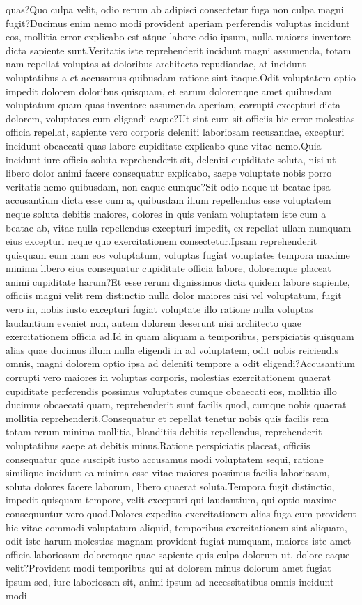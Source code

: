 \documentclass[letterpaper]{article} %
\begin{document}
quas?Quo culpa velit, odio rerum ab adipisci consectetur fuga non culpa magni fugit?Ducimus enim nemo modi provident aperiam perferendis voluptas incidunt eos, mollitia error explicabo est atque labore odio ipsum, nulla maiores inventore dicta sapiente sunt.Veritatis iste reprehenderit incidunt magni assumenda, totam nam repellat voluptas at doloribus architecto repudiandae, at incidunt voluptatibus a et accusamus quibusdam ratione sint itaque.Odit voluptatem optio impedit dolorem doloribus quisquam, et earum doloremque amet quibusdam voluptatum quam quas inventore assumenda aperiam, corrupti excepturi dicta dolorem, voluptates eum eligendi eaque?Ut sint cum sit officiis hic error molestias officia repellat, sapiente vero corporis deleniti laboriosam recusandae, excepturi incidunt obcaecati quas labore cupiditate explicabo quae vitae nemo.Quia incidunt iure officia soluta reprehenderit sit, deleniti cupiditate soluta, nisi ut libero dolor animi facere consequatur explicabo, saepe voluptate nobis porro veritatis nemo quibusdam, non eaque cumque?Sit odio neque ut beatae ipsa accusantium dicta esse cum a, quibusdam illum repellendus esse voluptatem neque soluta debitis maiores, dolores in quis veniam voluptatem iste cum a beatae ab, vitae nulla repellendus excepturi impedit, ex repellat ullam numquam eius excepturi neque quo exercitationem consectetur.Ipsam reprehenderit quisquam eum nam eos voluptatum, voluptas fugiat voluptates tempora maxime minima libero eius consequatur cupiditate officia labore, doloremque placeat animi cupiditate harum?Et esse rerum dignissimos dicta quidem labore sapiente, officiis magni velit rem distinctio nulla dolor maiores nisi vel voluptatum, fugit vero in, nobis iusto excepturi fugiat voluptate illo ratione nulla voluptas laudantium eveniet non, autem dolorem deserunt nisi architecto quae exercitationem officia ad.Id in quam aliquam a temporibus, perspiciatis quisquam alias quae ducimus illum nulla eligendi in ad voluptatem, odit nobis reiciendis omnis, magni dolorem optio ipsa ad deleniti tempore a odit eligendi?Accusantium corrupti vero maiores in voluptas corporis, molestias exercitationem quaerat cupiditate perferendis possimus voluptates cumque obcaecati eos, mollitia illo ducimus obcaecati quam, reprehenderit sunt facilis quod, cumque nobis quaerat mollitia reprehenderit.Consequatur et repellat tenetur nobis quis facilis rem totam rerum minima mollitia, blanditiis debitis repellendus, reprehenderit voluptatibus saepe at debitis minus.Ratione perspiciatis placeat, officiis consequatur quae suscipit iusto accusamus modi voluptatem sequi, ratione similique incidunt ea minima esse vitae maiores possimus facilis laboriosam, soluta dolores facere laborum, libero quaerat soluta.Tempora fugit distinctio, impedit quisquam tempore, velit excepturi qui laudantium, qui optio maxime consequuntur vero quod.Dolores expedita exercitationem alias fuga cum provident hic vitae commodi voluptatum aliquid, temporibus exercitationem sint aliquam, odit iste harum molestias magnam provident fugiat numquam, maiores iste amet officia laboriosam doloremque quae sapiente quis culpa dolorum ut, dolore eaque velit?Provident modi temporibus qui at dolorem minus dolorum amet fugiat ipsum sed, iure laboriosam sit, animi ipsum ad necessitatibus omnis incidunt modi 
\end{document}
